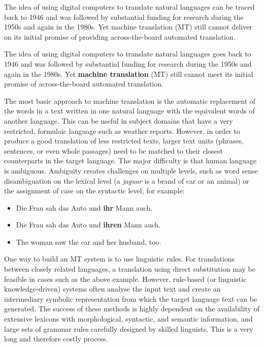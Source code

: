 \documentclass[]{../../metanetpaper}
\begin{document}
\begin{multicols}{2}
The idea of using digital computers to translate natural languages can be traced back to 1946 and was followed by substantial funding for research during the 1950s and again in the 1980s. 
Yet machine translation (MT) still cannot deliver on its initial promise of providing across-the-board automated translation.  


The idea of using digital computers to translate natural languages goes back to 1946 and was followed by substantial funding for research during the 1950s and again in the 1980s. Yet \textbf{machine translation} (MT) still cannot meet its initial promise of across-the-board automated translation. 

The most basic approach to machine translation is the automatic replacement of the words in a text written in one natural language with the equivalent words of another language. This can be useful in subject domains that have a very restricted, formulaic language such as weather reports.
However, in order to produce a good translation of less restricted texts, larger text units (phrases, sentences, or even whole passages) need to be matched to their closest counterparts in the target language. The major difficulty is that human language is ambiguous. Ambiguity creates challenges on multiple levels, such as word sense disambiguation on the lexical level (a \textit{jaguar} is a brand of car or an animal) or the assignment of case on the syntactic level, for example:

\begin{itemize}
\item Die Frau sah das Auto und \textbf{ihr} Mann auch.
\item Die Frau sah das Auto und \textbf{ihren} Mann auch.
\item The woman saw the car and her husband, too.
\end{itemize}

One way to build an MT system is to use linguistic rules. For translations between closely related languages, a translation using direct substitution may be feasible in cases such as the above example. However, rule-based (or linguistic knowledge-driven) systems often analyse the input text and create an intermediary symbolic representation from which the target language text can be generated. The success of these methods is highly dependent on the availability of extensive lexicons with morphological, syntactic, and semantic information, and large sets of grammar rules carefully designed by skilled linguists. This is a very long and therefore costly process.


\end{multicols}
\end{document}
